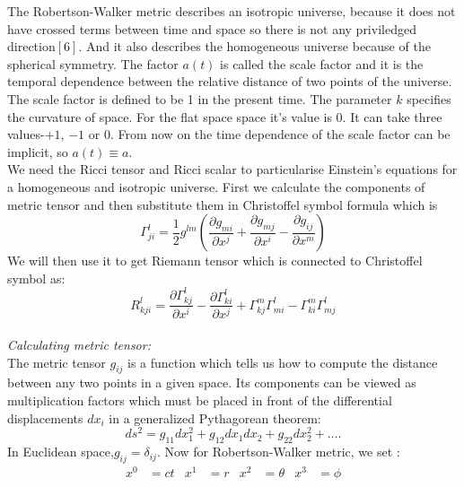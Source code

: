 \documentclass[14pt]{extarticle}
\begin{document}
The Robertson-Walker metric describes an isotropic universe, because it does not have crossed terms between time and space so there is not any priviledged direction$[6]$. And it also describes the homogeneous universe because of the spherical symmetry. The factor $a(t)$ is called the scale factor and it is the temporal dependence between the relative distance of two points of the universe. The scale factor is defined to be 1 in the present time. The parameter $k$ specifies the curvature of space. For the flat space space it's value is $0$. It can take three values-$+1$, $-1$ or $0$. From now on the time dependence of the scale factor can be implicit, so $a(t)\equiv a$. \\
We need the Ricci tensor and Ricci scalar to particularise Einstein's equations for a homogeneous and isotropic universe. First we calculate the components of metric tensor and then substitute them in Christoffel symbol formula which is\\
\begin{equation}
\Gamma_{j i}^{l}=\frac{1}{2} g^{l m}\left(\frac{\partial g_{m i}}{\partial x^{j}}+\frac{\partial g_{m j}}{\partial x^{i}}-\frac{\partial g_{i j}}{\partial x^{m}}\right)
\end{equation}
We will then use it to get Riemann tensor which is connected to Christoffel symbol as:\\
\begin{equation}
R_{k j i}^{l} = \frac{\partial \Gamma_{k j}^{l}}{\partial x^{i}}-\frac{\partial \Gamma_{k i}^{l}}{\partial x^{j}}+\Gamma_{k j}^{m} \Gamma_{m i}^{l}-\Gamma_{k i}^{m} \Gamma_{m j}^{l}
\end{equation}\\
\textit{Calculating metric tensor:}\\
The metric tensor $g_{i j}$ is a function which tells us how to compute the distance between any two points in a given space.  Its components can be viewed as multiplication factors which must be placed in front of the differential displacements $dx_{i}$ in a generalized Pythagorean theorem:\\
\begin{equation}
d s^{2}=g_{11} d x_{1}^{2}+g_{12} d x_{1} d x_{2}+g_{22} d x_{2}^{2}+\ldots .
\end{equation}
In Euclidean space,$g_{i j}=\delta_{i j}$. Now for Robertson-Walker metric, we set :\\
\begin{align*}
x^{0}&=ct &  x^{1}&=r &  x^{2}&=\theta &  x^{3}&=\phi
\end{align*}
\end{document}
